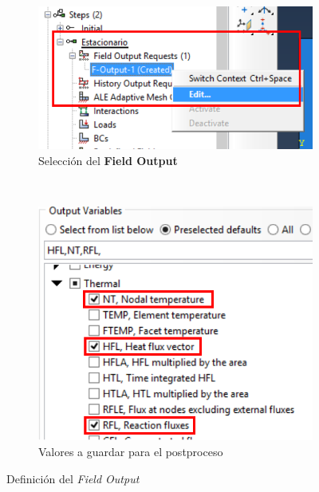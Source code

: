   \begin{figure}
    \centering
    \begin{subfigure}[!h]{0.45\textwidth}
      \includegraphics[width=\textwidth]{./body/images/step04.pdf}
      \caption{Selección del \textbf{Field Output}}
      \label{step04}
    \end{subfigure}%
    ~ %
    \begin{subfigure}[!h]{0.45\textwidth}
      \includegraphics[width=\textwidth]{./body/images/step05.pdf}
      \caption{Valores a guardar para el postproceso}
      \label{step05}
    \end{subfigure}%
    \caption{Definición del \textit{Field Output}}
  \end{figure}

